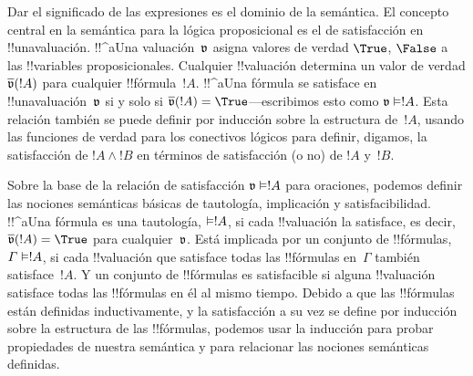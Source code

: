 \documentclass[../../../include/open-logic-section]{subfiles}
\begin{document}
Dar el significado de las expresiones es el dominio de la semántica. El concepto central en la semántica para la lógica proposicional es el de satisfacción en !!una{valuación}. !!^a{Una valuación}~$\pAssign{v}$ asigna valores de verdad $\True$, $\False$ a las !!{variables proposicionales}. Cualquier !!{valuación} determina un valor de verdad $\pValue{v}(!A)$ para cualquier !!{fórmula}~$!A$. !!^a{Una fórmula} se satisface en !!una{valuación}~$\pAssign{v}$ si y solo si $\pValue{v}(!A) = \True$---escribimos esto como $\pSat{v}{!A}$. Esta relación también se puede definir por inducción sobre la estructura de~$!A$, usando las funciones de verdad para los conectivos lógicos para definir, digamos, la satisfacción de $!A \land !B$ en términos de satisfacción (o no) de $!A$ y~$!B$.

Sobre la base de la relación de satisfacción $\pSat{v}{!A}$ para oraciones, podemos definir las nociones semánticas básicas de tautología, implicación y satisfacibilidad. !!^a{Una fórmula} es una tautología, $\Entails !A$, si cada !!{valuación} la satisface, es decir, $\pValue{v}(!A) = \True$ para cualquier~$\pAssign{v}$. Está implicada por un conjunto de !!{fórmulas}, $\Gamma \Entails !A$, si cada !!{valuación} que satisface todas las !!{fórmulas} en~$\Gamma$ también satisface~$!A$. Y un conjunto de !!{fórmulas} es satisfacible si alguna !!{valuación} satisface todas las !!{fórmulas} en él al mismo tiempo. Debido a que las !!{fórmulas} están definidas inductivamente, y la satisfacción a su vez se define por inducción sobre la estructura de las !!{fórmulas}, podemos usar la inducción para probar propiedades de nuestra semántica y para relacionar las nociones semánticas definidas.
\end{document}
